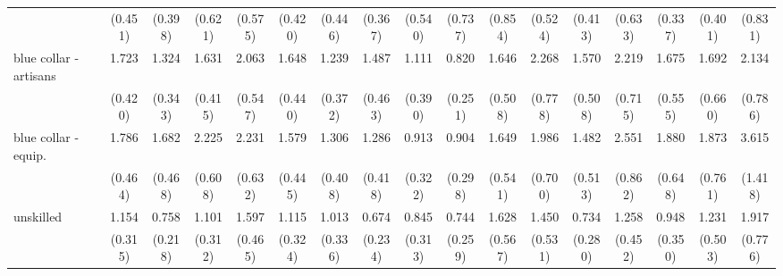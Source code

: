 {\begin{tabular}{l*{16}{c}}
                    &     (0.451)         &     (0.398)         &     (0.621)         &     (0.575)         &     (0.420)         &     (0.446)         &     (0.367)         &     (0.540)         &     (0.737)         &     (0.854)         &     (0.524)         &     (0.413)         &     (0.633)         &     (0.337)         &     (0.401)         &     (0.831)         \\
[1em]
blue collar - artisans&       1.723\sym{*}  &       1.324         &       1.631         &       2.063\sym{**} &       1.648         &       1.239         &       1.487         &       1.111         &       0.820         &       1.646         &       2.268\sym{*}  &       1.570         &       2.219\sym{*}  &       1.675         &       1.692         &       2.134\sym{*}  \\
                    &     (0.420)         &     (0.343)         &     (0.415)         &     (0.547)         &     (0.440)         &     (0.372)         &     (0.463)         &     (0.390)         &     (0.251)         &     (0.508)         &     (0.778)         &     (0.508)         &     (0.715)         &     (0.555)         &     (0.660)         &     (0.786)         \\
[1em]
blue collar - equip.&       1.786\sym{*}  &       1.682         &       2.225\sym{**} &       2.231\sym{**} &       1.579         &       1.306         &       1.286         &       0.913         &       0.904         &       1.649         &       1.986         &       1.482         &       2.551\sym{**} &       1.880         &       1.873         &       3.615\sym{**} \\
                    &     (0.464)         &     (0.468)         &     (0.608)         &     (0.632)         &     (0.445)         &     (0.408)         &     (0.418)         &     (0.322)         &     (0.298)         &     (0.541)         &     (0.700)         &     (0.513)         &     (0.862)         &     (0.648)         &     (0.761)         &     (1.418)         \\
[1em]
unskilled           &       1.154         &       0.758         &       1.101         &       1.597         &       1.115         &       1.013         &       0.674         &       0.845         &       0.744         &       1.628         &       1.450         &       0.734         &       1.258         &       0.948         &       1.231         &       1.917         \\
                    &     (0.315)         &     (0.218)         &     (0.312)         &     (0.465)         &     (0.324)         &     (0.336)         &     (0.234)         &     (0.313)         &     (0.259)         &     (0.567)         &     (0.531)         &     (0.280)         &     (0.452)         &     (0.350)         &     (0.503)         &     (0.776)         \\

\end{tabular}}
